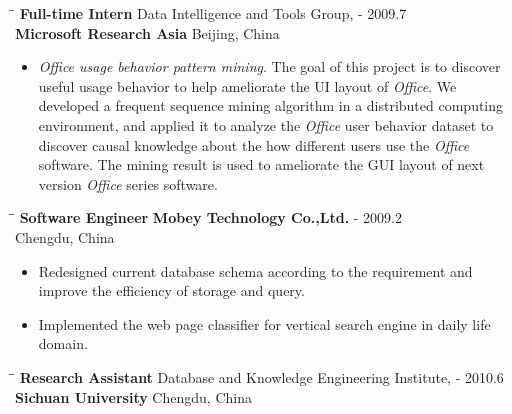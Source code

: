 \documentclass{res}
\begin{document}
\begin{resume}
   \begin{tabbing}
   \hspace{1.6in}\= \hspace{3.3in}\= \kill %
    {\bf Full-time Intern} \> Data Intelligence and Tools Group,    - 2009.7\\
                            \>\textbf {Microsoft Research Asia}        \>Beijing, China\\
   \end{tabbing}      %
   \vspace{-5pt}
   \begin{itemize}
    \item \emph{Office usage behavior pattern mining}. The goal of this project is to discover useful usage behavior to help ameliorate the UI layout of \emph{Office}. 
	We developed a frequent sequence mining algorithm in a distributed computing environment, and applied it to analyze the \emph{Office} user behavior dataset to discover causal knowledge about the how different users use the \emph{Office} software. The mining result is used to ameliorate the GUI layout of next version \emph{Office} series software.
   \end{itemize}

   \begin{tabbing}
   \hspace{1.6in}\= \hspace{3.3in}\= \kill %
    {\bf Software Engineer} \>\textbf {Mobey Technology Co.,Ltd.}       - 2009.2\\
                                \>                  \>Chengdu, China\\
   \end{tabbing}      %
   \vspace{-5pt}
   \begin{itemize}
    \item  Redesigned current database schema according to the requirement and improve the efficiency of storage and query.
    \item  Implemented the web page classifier for vertical search engine in daily life domain.
    \end{itemize}

   \begin{tabbing}
   \hspace{1.6in}\= \hspace{3.3in}\= \kill %
    {\bf Research Assistant} \> Database and Knowledge Engineering Institute,    - 2010.6\\
                            \>\textbf {Sichuan University}        \>Chengdu, China\\


\end{tabbing}
\end{resume}
\end{document}
